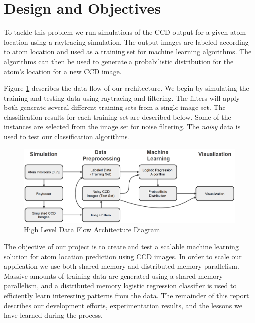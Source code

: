 \section{Design and Objectives}
\label{design}

To tackle this problem we run simulations of the CCD output for a given atom location using a raytracing simulation.  The output images are labeled according to atom location and used as a training set for machine learning algorithms.  The algorithms can then be used to generate a probabilistic distribution for the atom's location for a new CCD image.  

Figure \ref{fig:arch} describes the data flow of our architecture.  We begin by simulating the training and testing data using raytracing and filtering.  The filters will apply both generate several different training sets from a single image set.  The classification results for each training set are described below.  Some of the instances are selected from the image set for noise filtering.  The \emph{noisy} data is used to test our classification algorithms.

\begin{figure}[h]
\begin{center}
\includegraphics[scale=0.4]{arch.png}
\caption{High Level Data Flow Architecture Diagram}
\label{fig:arch}
\end{center}
\end{figure}

The objective of our project is to create and test a scalable machine learning solution for atom location prediction using CCD images.  In order to scale our application we use both shared memory and distributed memory parallelism.  Massive amounts of training data are generated using a shared memory parallelism, and a distributed memory logistic regression classifier is used to efficiently learn interesting patterns from the data.  The remainder of this report describes our development efforts, experimentation results, and the lessons we have learned during the process.